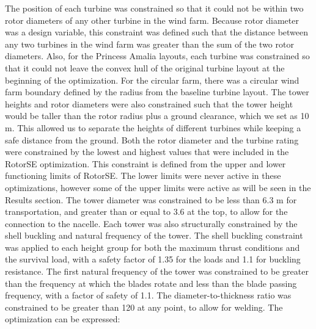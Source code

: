         The position of each turbine was constrained so that it could not be within two rotor diameters of any other turbine in the wind farm. Because rotor diameter was a design variable, this constraint was defined such that the distance between any two turbines in the wind farm was greater than the sum of the two rotor diameters. Also, for the Princess Amalia layouts, each turbine was constrained so that it could not leave the convex hull of the original turbine layout at the beginning of the optimization. For the circular farm, there was a circular wind farm boundary defined by the radius from the baseline turbine layout. %
        The tower heights and rotor diameters were also constrained such that the tower height would be taller than the rotor radius plus a ground clearance, which we set as 10 m. This allowed us to separate the heights of different turbines while keeping a safe distance from the ground. 
        Both the rotor diameter and the turbine rating were constrained by the lowest and highest values that were included in the RotorSE optimization. This constraint is defined from the upper and lower functioning limits of RotorSE. The lower limits were never active in these optimizations, however some of the upper limits were active as will be seen in the Results section.
        The tower diameter was constrained to be less than 6.3 m for transportation, and greater than or equal to 3.6 at the top, to allow for the connection to the nacelle. Each tower was also structurally constrained by the shell buckling and natural frequency of the tower. The shell buckling constraint was applied to each height group for both the maximum thrust conditions and the survival load, with a safety factor of 1.35 for the loads and 1.1 for buckling resistance. The first natural frequency of the tower was constrained to be greater than the frequency at which the blades rotate and less than the blade passing frequency, with a factor of safety of 1.1. The diameter-to-thickness ratio was constrained to be greater than 120 at any point, to allow for welding. The optimization can be expressed:
        
